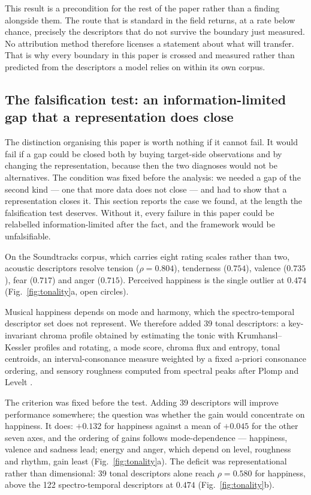 This result is a precondition for the rest of the paper rather than a finding
alongside them. The route that is standard in the field returns, at a rate below
chance, precisely the descriptors that do not survive the boundary just measured.
No attribution method therefore licenses a statement about what will transfer. That
is why every boundary in this paper is crossed and measured rather than predicted
from the descriptors a model relies on within its own corpus.

\subsection*{The falsification test: an information-limited gap that a
representation does close}

The distinction organising this paper is worth nothing if it cannot fail. It would
fail if a gap could be closed both by buying target-side observations and by
changing the representation, because then the two diagnoses would not be
alternatives. The condition was fixed before the analysis: we needed a gap of the
second kind --- one that more data does not close --- and had to show that a
representation closes it. This section reports the case we found, at the length the
falsification test deserves. Without it, every failure in this paper could be
relabelled information-limited after the fact, and the framework would be
unfalsifiable.

On the Soundtracks corpus, which carries eight rating scales rather than two,
acoustic descriptors resolve tension ($\rho = 0.804$), tenderness ($0.754$),
valence ($0.735$), fear ($0.717$) and anger ($0.715$). Perceived happiness is the
single outlier at $0.474$ (Fig.~\ref{fig:tonality}a, open circles).

Musical happiness depends on mode and harmony, which the spectro-temporal
descriptor set does not represent. We therefore added 39 tonal descriptors: a
key-invariant chroma profile obtained by estimating the tonic with
Krumhansl--Kessler profiles \citep{krumhansl1982} and rotating, a mode score,
chroma flux and entropy, tonal centroids, an interval-consonance measure weighted
by a fixed a-priori consonance ordering, and sensory roughness computed from
spectral peaks after Plomp and Levelt \citep{plomp1965}.

The criterion was fixed before the test. Adding 39 descriptors will improve
performance somewhere; the question was whether the gain would concentrate on
happiness. It does: $+0.132$ for happiness against a mean of $+0.045$ for the other
seven axes, and the ordering of gains follows mode-dependence --- happiness,
valence and sadness lead; energy and anger, which depend on level, roughness and
rhythm, gain least (Fig.~\ref{fig:tonality}a). The deficit was representational
rather than dimensional: 39 tonal descriptors alone reach $\rho = 0.580$ for
happiness, above the 122 spectro-temporal descriptors at $0.474$
(Fig.~\ref{fig:tonality}b).

